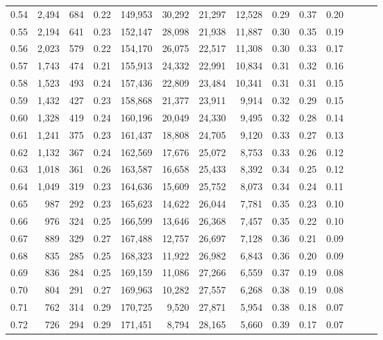 \begin{tabular}{rrrrrrrrrrrrrr}
0.54 &  2,494 &  684 &  0.22 &  149,953 &   30,292 &  21,297 &  12,528 &  0.29 &  0.37 &      0.20 \\
0.55 &  2,194 &  641 &  0.23 &  152,147 &   28,098 &  21,938 &  11,887 &  0.30 &  0.35 &      0.19 \\
0.56 &  2,023 &  579 &  0.22 &  154,170 &   26,075 &  22,517 &  11,308 &  0.30 &  0.33 &      0.17 \\
0.57 &  1,743 &  474 &  0.21 &  155,913 &   24,332 &  22,991 &  10,834 &  0.31 &  0.32 &      0.16 \\
0.58 &  1,523 &  493 &  0.24 &  157,436 &   22,809 &  23,484 &  10,341 &  0.31 &  0.31 &      0.15 \\
0.59 &  1,432 &  427 &  0.23 &  158,868 &   21,377 &  23,911 &   9,914 &  0.32 &  0.29 &      0.15 \\
0.60 &  1,328 &  419 &  0.24 &  160,196 &   20,049 &  24,330 &   9,495 &  0.32 &  0.28 &      0.14 \\
0.61 &  1,241 &  375 &  0.23 &  161,437 &   18,808 &  24,705 &   9,120 &  0.33 &  0.27 &      0.13 \\
0.62 &  1,132 &  367 &  0.24 &  162,569 &   17,676 &  25,072 &   8,753 &  0.33 &  0.26 &      0.12 \\
0.63 &  1,018 &  361 &  0.26 &  163,587 &   16,658 &  25,433 &   8,392 &  0.34 &  0.25 &      0.12 \\
0.64 &  1,049 &  319 &  0.23 &  164,636 &   15,609 &  25,752 &   8,073 &  0.34 &  0.24 &      0.11 \\
0.65 &    987 &  292 &  0.23 &  165,623 &   14,622 &  26,044 &   7,781 &  0.35 &  0.23 &      0.10 \\
0.66 &    976 &  324 &  0.25 &  166,599 &   13,646 &  26,368 &   7,457 &  0.35 &  0.22 &      0.10 \\
0.67 &    889 &  329 &  0.27 &  167,488 &   12,757 &  26,697 &   7,128 &  0.36 &  0.21 &      0.09 \\
0.68 &    835 &  285 &  0.25 &  168,323 &   11,922 &  26,982 &   6,843 &  0.36 &  0.20 &      0.09 \\
0.69 &    836 &  284 &  0.25 &  169,159 &   11,086 &  27,266 &   6,559 &  0.37 &  0.19 &      0.08 \\
0.70 &    804 &  291 &  0.27 &  169,963 &   10,282 &  27,557 &   6,268 &  0.38 &  0.19 &      0.08 \\
0.71 &    762 &  314 &  0.29 &  170,725 &    9,520 &  27,871 &   5,954 &  0.38 &  0.18 &      0.07 \\
0.72 &    726 &  294 &  0.29 &  171,451 &    8,794 &  28,165 &   5,660 &  0.39 &  0.17 &      0.07 \\

\end{tabular}
